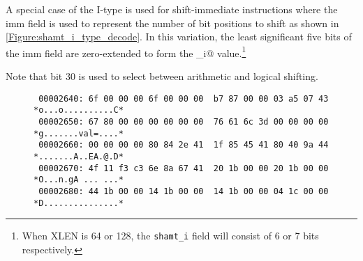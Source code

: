 \begin{figure}[ht]
\centering
\DrawInsnOpITypeDecoding
{}
\label{Figure:i_type_decode}
\label{imm.i:decode}
\end{figure}

A special case of the I-type is used for shift-immediate instructions 
where the imm field is used to represent the number of bit positions 
to shift as shown in \autoref{Figure:shamt_i_type_decode}.
In this variation, the least significant five bits of the imm field are 
zero-extended to form the \verb@shamt_i@ 
value.\footnote{When XLEN is 64 or 128, the {\tt shamt\_i} field will 
consist of 6 or 7 bits respectively.}

\begin{figure}[ht]
\centering
\DrawInsnOpIShiftTypeDecoding
{}
\label{Figure:shamt_i_type_decode}
\label{shamt.i:decode}
\end{figure}

Note that bit 30 is used to select between arithmetic and logical shifting.

\begin{figure}[ht]
\centering
\begin{verbatim}
 00002640: 6f 00 00 00 6f 00 00 00  b7 87 00 00 03 a5 07 43 *o...o..........C*
 00002650: 67 80 00 00 00 00 00 00  76 61 6c 3d 00 00 00 00 *g.......val=....*
 00002660: 00 00 00 00 80 84 2e 41  1f 85 45 41 80 40 9a 44 *.......A..EA.@.D*
 00002670: 4f 11 f3 c3 6e 8a 67 41  20 1b 00 00 20 1b 00 00 *O...n.gA ... ...*
 00002680: 44 1b 00 00 14 1b 00 00  14 1b 00 00 04 1c 00 00 *D...............*
\end{verbatim}
\label{Figure:imm:memory:dump}
\end{figure}


